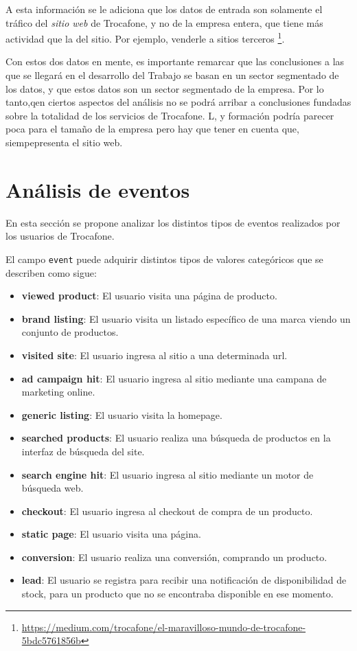 \documentclass[a4paper]{article}
\begin{document}
A esta información se le adiciona que los datos de entrada son solamente el tráfico del \textit{sitio web} de Trocafone, y no de la empresa entera, que tiene más actividad que la del sitio. Por ejemplo, venderle a sitios terceros \footnote{\url{https://medium.com/trocafone/el-maravilloso-mundo-de-trocafone-5bdc5761856b}}.

Con estos dos datos en mente, es importante remarcar que las conclusiones a las que se llegará en el desarrollo del Trabajo se basan en un sector segmentado de los datos, y que estos datos son un sector segmentado de la empresa. Por lo tanto,qen ciertos aspectos del análisis no se podrá arribar a conclusiones fundadas sobre la totalidad de los servicios de Trocafone. L, y formación podría parecer poca para el tamaño de la empresa pero hay que tener en cuenta que, siempepresenta el sitio web.

\section{Análisis de eventos}

En esta sección se propone analizar los distintos tipos de eventos realizados por los usuarios de Trocafone. 

El campo \texttt{event} puede adquirir distintos tipos de valores categóricos que se describen como sigue:

\begin{itemize}
	\item \textbf{viewed product}: El usuario visita una página de producto.
	\item \textbf{brand listing}: El usuario visita un listado específico de una marca viendo un conjunto de productos.
	\item \textbf{visited site}:  El usuario ingresa al sitio a una determinada url.
	\item \textbf{ad campaign hit}: El usuario ingresa al sitio mediante una campana de marketing online.
	\item \textbf{generic listing}: El usuario visita la homepage.
	\item \textbf{searched products}: El usuario realiza una búsqueda de productos en la interfaz de búsqueda del site.
	\item \textbf{search engine hit}: El usuario ingresa al sitio mediante un motor de búsqueda web.
	\item \textbf{checkout}: El usuario ingresa al checkout de compra de un producto.
	\item \textbf{static page}:  El usuario visita una página.
	\item \textbf{conversion}: El usuario realiza una conversión, comprando un producto.
	\item \textbf{lead}: El usuario se registra para recibir una notificación de disponibilidad de stock, para un producto que no se encontraba disponible en ese momento.					
\end{itemize}
\end{document}
